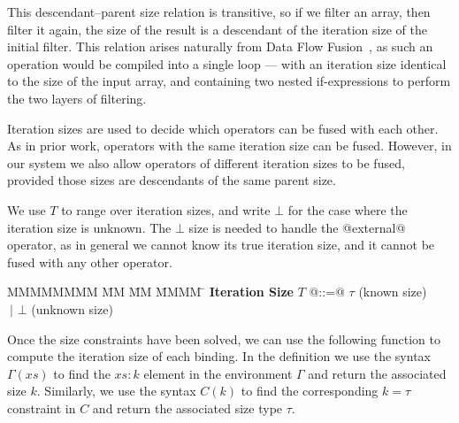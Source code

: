 This descendant--parent size relation is transitive, so if we filter an array, then filter it again, the size of the result is a descendant of the iteration size of the initial filter. This relation arises naturally from Data Flow Fusion~\cite{lippmeier2013flow}, as such an operation would be compiled into a single loop --- with an iteration size identical to the size of the input array, and containing two nested if-expressions to perform the two layers of filtering.

Iteration sizes are used to decide which operators can be fused with each other. As in prior work, operators with the same iteration size can be fused. However, in our system we also allow operators of different iteration sizes to be fused, provided those sizes are descendants of the same parent size.

We use $T$ to range over iteration sizes, and write $\bot$ for the case where the iteration size is unknown. The $\bot$ size is needed to handle the @external@ operator, as in general we cannot know its true iteration size, and it cannot be fused with any other operator.

\begin{tabbing}
MMMMMMMM \= MM       \= MM \= MMMM \= \kill
\textbf{Iteration Size}
 \> $T$         \> @::=@  \> $\tau$        \> (known size) \\
 \>             \> $~|$   \> $\bot$     \> (unknown size) \\
\end{tabbing}

Once the size constraints have been solved, we can use the following function to compute the iteration size of each binding. In the definition we use the syntax $\Gamma(xs)$ to find the $xs : k$ element in the environment $\Gamma$ and return the associated size $k$. Similarly, we use the syntax $C(k)$ to find the corresponding $k = \tau$ constraint in $C$ and return the associated size type $\tau$.


